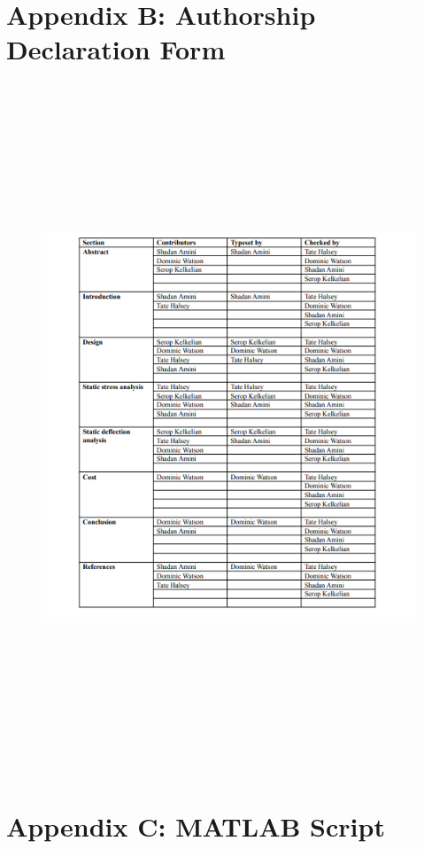 \documentclass[12pt]{article}
\begin{document}
\section{Appendix B: Authorship Declaration Form} 
\begin{figure}[H]
\centering
\includegraphics[height= 20.5cm, width= 18.5cm]{AuthorDec.png}
\end{figure}
\newpage

\section{Appendix C: MATLAB Script}

\newpage
\end{document}
